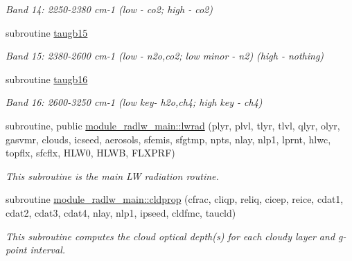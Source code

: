 \begin{DoxyCompactItemize}
\begin{DoxyCompactList}\small\item\em Band 14\+: 2250-\/2380 cm-\/1 (low -\/ co2; high -\/ co2) \end{DoxyCompactList}\item 
\mbox{\label{radlw__main_8f_a93b5c0ae0525697ffffb6228581a301c}} 
subroutine \hyperlink{radlw__main_8f_a93b5c0ae0525697ffffb6228581a301c}{taugb15}
\begin{DoxyCompactList}\small\item\em Band 15\+: 2380-\/2600 cm-\/1 (low -\/ n2o,co2; low minor -\/ n2) (high -\/ nothing) \end{DoxyCompactList}\item 
\mbox{\label{radlw__main_8f_a942ce0031745cd1b3b4ebc3915970554}} 
subroutine \hyperlink{radlw__main_8f_a942ce0031745cd1b3b4ebc3915970554}{taugb16}
\begin{DoxyCompactList}\small\item\em Band 16\+: 2600-\/3250 cm-\/1 (low key-\/ h2o,ch4; high key -\/ ch4) \end{DoxyCompactList}\end{DoxyCompactItemize}
\textbf{ }\par
\begin{DoxyCompactItemize}
\item 
subroutine, public \hyperlink{group__module__radlw__main_gaf20db29eaadab298ccd8b6bf489a53f4}{module\+\_\+radlw\+\_\+main\+::lwrad} (plyr, plvl, tlyr, tlvl, qlyr, olyr, gasvmr, clouds, icseed, aerosols, sfemis, sfgtmp, npts, nlay, nlp1, lprnt, hlwc, topflx, sfcflx, H\+L\+W0, H\+L\+WB, F\+L\+X\+P\+RF)
\begin{DoxyCompactList}\small\item\em This subroutine is the main LW radiation routine. \end{DoxyCompactList}\end{DoxyCompactItemize}

\textbf{ }\par
\begin{DoxyCompactItemize}
\item 
subroutine \hyperlink{group__module__radlw__main_ga6bfdea656cc7e1f773ffcc797e072e91}{module\+\_\+radlw\+\_\+main\+::cldprop} (cfrac, cliqp, reliq, cicep, reice, cdat1, cdat2, cdat3, cdat4, nlay, nlp1, ipseed, cldfmc, taucld)
\begin{DoxyCompactList}\small\item\em This subroutine computes the cloud optical depth(s) for each cloudy layer and g-\/point interval. \end{DoxyCompactList}\end{DoxyCompactItemize}

